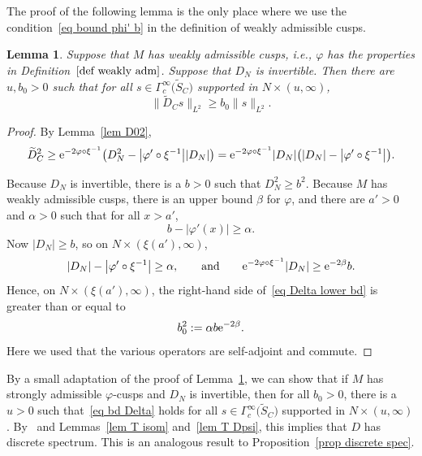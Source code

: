 \documentclass[10pt,a4paper]{amsart}
\numberwithin{equation}{section}
\newtheorem{Lemma}[Theorem]{Lemma}
\begin{document}
The proof of the following lemma is the only place where we use the condition~\eqref{eq bound phi' b} in the definition of weakly admissible cusps.
\begin{Lemma}\label{lem bd Delta}
Suppose that $M$ has weakly admissible cusps, i.e., $\varphi$ has the properties in Definition~$\ref{def weakly adm}$.
Suppose that $D_N$ is invertible. Then there are $u,b_0>0$ such that for all $s \in \Gamma_c^{\infty}\big(\widetilde{S}_C)$ supported in $N \times (u,\infty)$,
\begin{equation} \label{eq bd Delta}
\big\| \widetilde{D}_C s \big\|_{L^2} \geq b_0 \|s \|_{L^2}.
\end{equation}
\end{Lemma}
\begin{proof}
By Lemma~\ref{lem D02},
\begin{equation} \label{eq Delta lower bd}
\widetilde{D}_C^2 \geq {\rm e}^{-2 \varphi \circ \xi^{-1}} \big(D_N^2 - \big|\varphi' \circ \xi^{-1}\big| |D_N|\big)
= {\rm e}^{-2 \varphi \circ \xi^{-1}} |D_N| \bigl( |D_N| - \big|\varphi' \circ \xi^{-1}\big| \bigr).
\end{equation}

Because $D_N$ is invertible, there is a $b>0$ such that $D_N^2\geq b^2$. Because $M$ has weakly admissible cusps, there is an upper bound $\beta$ for $\varphi$, and there are
 $a'>0$ and $\alpha>0$ such that for all $x>a'$,
\[
 b-|\varphi'(x)|\geq \alpha.
\]
Now $|D_N| \geq b$, so on $N \times (\xi(a'), \infty)$,
\[
 |D_N| - \big|\varphi' \circ \xi^{-1}\big|\geq \alpha, \qquad \text{and}\qquad
{\rm e}^{-2 \varphi \circ \xi^{-1}} |D_N| \geq {\rm e}^{-2\beta} b.
\]
Hence, on $N \times (\xi(a'), \infty)$, the right-hand side of~\eqref{eq Delta lower bd} is greater than or equal to
\[
b_0^2 := \alpha b{\rm e}^{-2\beta}.
\]
Here we used that the various operators are self-adjoint and commute.
\end{proof}

\begin{Remark}
By a small adaptation of the proof of Lemma~\ref{lem bd Delta}, we can show that if $M$ has strongly admissible $\varphi$-cusps and $D_N$ is invertible, then for all $b_0>0$, there is a $u>0$ such that~\eqref{eq bd Delta} holds
 for all $s \in \Gamma_c^{\infty}\big(\widetilde{S}_C\big)$ supported in $N \times (u,\infty)$. By~\cite[Theorem~SD]{Anghel16} and Lemmas~\ref{lem T isom} and~\ref{lem T Dpsi}, this implies that $D$ has discrete spectrum. This is an analogous result to Proposition~\ref{prop discrete spec}.
\end{Remark}
\end{document}

